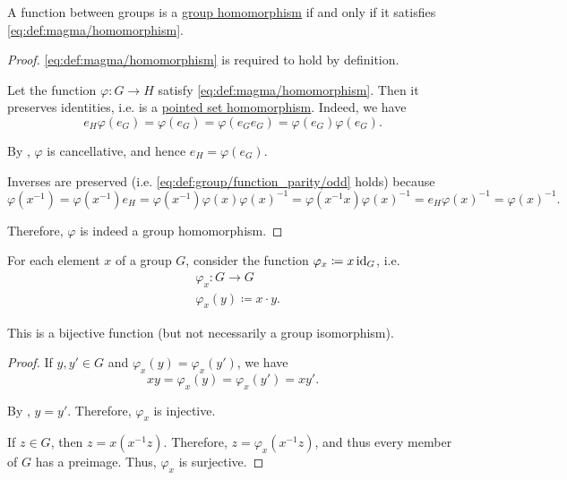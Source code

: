 \begin{proposition}\label{thm:group_homomorphism_single_condition}
  A function between groups is a \hyperref[def:group/homomorphism]{group homomorphism} if and only if it satisfies \eqref{eq:def:magma/homomorphism}.
\end{proposition}
\begin{proof}
  \SufficiencySubProof \eqref{eq:def:magma/homomorphism} is required to hold by definition.

  \NecessitySubProof Let the function \( \varphi: G \to H \) satisfy \eqref{eq:def:magma/homomorphism}. Then it preserves identities, i.e. is a \hyperref[def:pointed_set/homomorphism]{pointed set homomorphism}. Indeed, we have
  \begin{equation*}
    e_H \varphi(e_G) = \varphi(e_G) = \varphi(e_G e_G) = \varphi(e_G) \varphi(e_G).
  \end{equation*}

  By , \( \varphi \) is cancellative, and hence \( e_H = \varphi(e_G) \).

  Inverses are preserved (i.e. \eqref{eq:def:group/function_parity/odd} holds) because
  \begin{equation*}
    \varphi(x^{-1})
    =
    \varphi(x^{-1}) e_H
    =
    \varphi(x^{-1}) \varphi(x) \varphi(x)^{-1}
    =
    \varphi(x^{-1} x) \varphi(x)^{-1}
    =
    e_H \varphi(x)^{-1}
    =
    \varphi(x)^{-1}.
  \end{equation*}

  Therefore, \( \varphi \) is indeed a group homomorphism.
\end{proof}

\begin{lemma}\label{thm:group_operation_induces_bijections}
  For each element \( x \) of a group \( G \), consider the function \( \varphi_x \coloneqq x \operatorname{id}_G \), i.e.
  \begin{equation*}
    \begin{aligned}
      &\varphi_x: G \to G \\
      &\varphi_x(y) \coloneqq x \cdot y.
    \end{aligned}
  \end{equation*}

  This is a bijective function (but not necessarily a group isomorphism).
\end{lemma}
\begin{proof}
   If \( y, y' \in G \) and \( \varphi_x(y) = \varphi_x(y') \), we have
  \begin{equation*}
    xy = \varphi_x(y) = \varphi_x(y') = xy'.
  \end{equation*}

  By , \( y = y' \). Therefore, \( \varphi_x \) is injective.

   If \( z \in G \), then \( z = x(x^{-1} z) \). Therefore, \( z = \varphi_x(x^{-1} z) \), and thus every member of \( G \) has a preimage. Thus, \( \varphi_x \) is surjective.
\end{proof}

